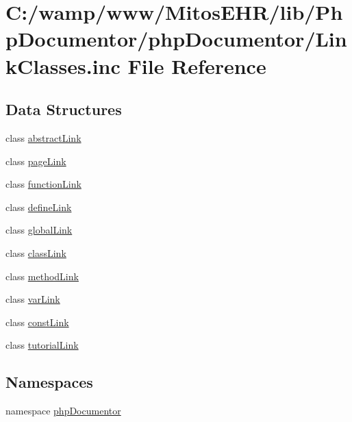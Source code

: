 \hypertarget{_link_classes_8inc}{\section{\-C\-:/wamp/www/\-Mitos\-E\-H\-R/lib/\-Php\-Documentor/php\-Documentor/\-Link\-Classes.inc \-File \-Reference}
\label{_link_classes_8inc}
}
\subsection*{\-Data \-Structures}
\begin{DoxyCompactItemize}
\item 
class \hyperlink{classabstract_link}{abstract\-Link}
\item 
class \hyperlink{classpage_link}{page\-Link}
\item 
class \hyperlink{classfunction_link}{function\-Link}
\item 
class \hyperlink{classdefine_link}{define\-Link}
\item 
class \hyperlink{classglobal_link}{global\-Link}
\item 
class \hyperlink{classclass_link}{class\-Link}
\item 
class \hyperlink{classmethod_link}{method\-Link}
\item 
class \hyperlink{classvar_link}{var\-Link}
\item 
class \hyperlink{classconst_link}{const\-Link}
\item 
class \hyperlink{classtutorial_link}{tutorial\-Link}
\end{DoxyCompactItemize}
\subsection*{\-Namespaces}
\begin{DoxyCompactItemize}
\item 
namespace \hyperlink{namespacephp_documentor}{php\-Documentor}
\end{DoxyCompactItemize}
